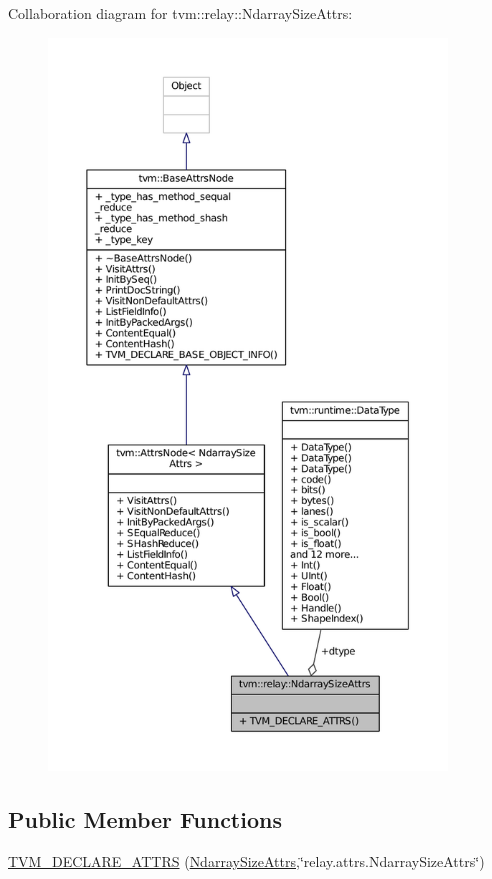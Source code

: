Collaboration diagram for tvm\+:\+:relay\+:\+:Ndarray\+Size\+Attrs\+:
\nopagebreak
\begin{figure}[H]
\begin{center}
\leavevmode
\includegraphics[height=550pt]{structtvm_1_1relay_1_1NdarraySizeAttrs__coll__graph}
\end{center}
\end{figure}
\subsection*{Public Member Functions}
\begin{DoxyCompactItemize}
\item 
\hyperlink{structtvm_1_1relay_1_1NdarraySizeAttrs_a827a1ea4525dba657390f53afe85e4c5}{T\+V\+M\+\_\+\+D\+E\+C\+L\+A\+R\+E\+\_\+\+A\+T\+T\+RS} (\hyperlink{structtvm_1_1relay_1_1NdarraySizeAttrs}{Ndarray\+Size\+Attrs},\char`\"{}relay.\+attrs.\+Ndarray\+Size\+Attrs\char`\"{})
\end{DoxyCompactItemize}

